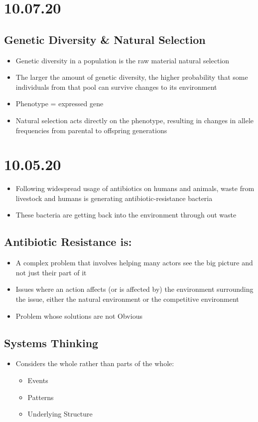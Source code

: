 \documentclass[11pt]{article}
\author{John Doe}
\date{\today}
\title{}
\begin{document}
\tableofcontents

\section{10.07.20}
\label{sec:orga1c30e1}
\subsection{Genetic Diversity \& Natural Selection}
\label{sec:org3568b12}
\begin{itemize}
\item Genetic diversity in a population is the raw material natural selection
\item The larger the amount of genetic diversity, the higher probability that some individuals from
that pool can survive changes to its environment
\item Phenotype = expressed gene
\item Natural selection acts directly on the phenotype, resulting in changes in allele frequencies
from parental to offspring generations
\end{itemize}
\section{10.05.20}
\label{sec:orge50cb91}
\begin{itemize}
\item Following widespread usage of antibiotics on humans and animals, waste from livestock and humans
is generating antibiotic-resistance bacteria
\item These bacteria are getting back into the environment through out waste
\end{itemize}
\subsection{Antibiotic Resistance is:}
\label{sec:org2895b1b}
\begin{itemize}
\item A complex problem that involves helping many actors see the big picture and not just their
part of it
\item Issues where an action affects (or is affected by) the environment surrounding the issue,
either the natural environment or the competitive environment
\item Problem whose solutions are not Obvious
\end{itemize}
\subsection{Systems Thinking}
\label{sec:orge807285}
\begin{itemize}
\item Considers the whole rather than parts of the whole:
\begin{itemize}
\item Events
\item Patterns
\item Underlying Structure
\end{itemize}
\end{itemize}
\end{document}

